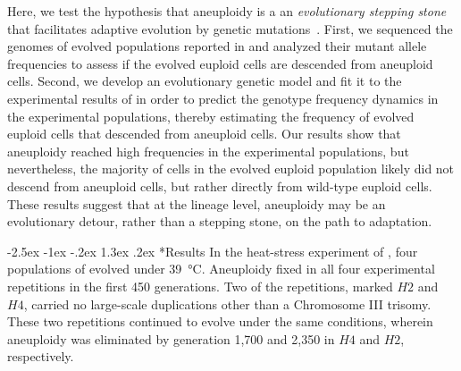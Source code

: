 \documentclass[12pt]{extarticle}
\makeatletter
\renewcommand\section{\@startsection {section}{1}{\z@}%
     {-2.5ex \@plus -1ex \@minus -.2ex}%
     {1.3ex \@plus.2ex}%
    {\Large\bfseries}}
\makeatother
\begin{document}
Here, we test the hypothesis that aneuploidy is a an \emph{evolutionary stepping stone} that facilitates adaptive evolution by genetic mutations~\citet{Yona2015}.
First, we sequenced the genomes of evolved populations reported in \citep{Yona2012} and analyzed their mutant allele frequencies to assess if the evolved euploid cells are descended from aneuploid cells.
Second, we develop an evolutionary genetic model and fit it to the experimental results of \citet{Yona2012} in order to predict the genotype frequency dynamics in the experimental populations, thereby estimating the frequency of evolved euploid cells that descended from aneuploid cells. 
Our results show that aneuploidy reached high frequencies in the experimental populations, but nevertheless, the majority of cells in the evolved euploid population likely did not descend from aneuploid cells, but rather directly from wild-type euploid cells.
These results suggest that at the lineage level, aneuploidy may be an evolutionary detour, rather than a stepping stone, on the path to adaptation.


\section*{Results}
In the heat-stress experiment of \citet{Yona2012}, four populations of \yeast evolved under \SI{39}{\celsius}.
Aneuploidy fixed in all four experimental repetitions in the first 450 generations.
Two of the repetitions, marked $H2$ and $H4$, carried no large-scale duplications other than a Chromosome III trisomy.
These two repetitions continued to evolve under the same conditions, wherein aneuploidy was eliminated by generation 1,700 and 2,350 in $H4$ and $H2$, respectively.
\end{document}
